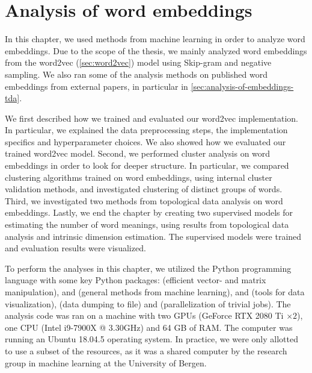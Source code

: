 \chapter{Analysis of word embeddings}
\label{chap:analysis-of-word-embeddings}
In this chapter, we used methods from machine learning in order to analyze word embeddings. Due to the scope of the thesis, we mainly analyzed word embeddings from the word2vec (\cref{sec:word2vec}) model using Skip-gram and negative sampling. We also ran some of the analysis methods on published word embeddings from external papers, in particular in \cref{sec:analysis-of-embeddings-tda}.

We first described how we trained and evaluated our word2vec implementation. In particular, we explained the data preprocessing steps, the implementation specifics and hyperparameter choices. We also showed how we evaluated our trained word2vec model. Second, we performed cluster analysis on word embeddings in order to look for deeper structure. In particular, we compared clustering algorithms trained on word embeddings, using internal cluster validation methods, and investigated clustering of distinct groups of words. Third, we investigated two methods from topological data analysis on word embeddings. Lastly, we end the chapter by creating two supervised models for estimating the number of word meanings, using results from topological data analysis and intrinsic dimension estimation. The supervised models were trained and evaluation results were visualized.

To perform the analyses in this chapter, we utilized the Python programming language with some key Python packages:  \cite{2020NumPy-Array} (efficient vector- and matrix manipulation),  \cite{ScikitLearn2011} and  \cite{2020SciPy-NMeth} (general methods from machine learning),  \cite{Matplotlib2007} and  \cite{seaborn2021} (tools for data visualization),  \cite{joblib2021} (data dumping to file) and   \cite{sharedmem2017} (parallelization of trivial jobs). The analysis code was ran on a machine with two GPUs (GeForce RTX 2080 Ti $\times2$), one CPU (Intel i9-7900X @ 3.30GHz) and 64 GB of RAM. The computer was running an Ubuntu 18.04.5 operating system. In practice, we were only allotted to use a subset of the resources, as it was a shared computer by the research group in machine learning at the University of Bergen.



